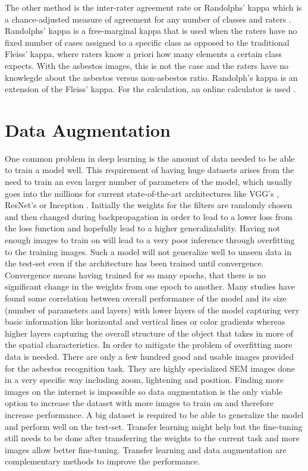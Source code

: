 The other method is the inter-rater agreement rate or Randolphs' kappa which is a chance-adjusted measure of agreement for any number of classes and raters \cite{randolph2005free}. Randolphs' kappa is a free-marginal kappa that is used when the raters have no fixed number of cases assigned to a specific class as opposed to the traditional Fleiss' kappa, where raters know a priori how many elements a certain class expects. With the asbestos images, this is not the case and the raters have no knowlegde about the asbestos versus non-asbestos ratio. Randolph's kappa is an extension of the Fleiss' kappa. For the calculation, an online calculator is used \cite{humanlevel2014}.

\section{Data Augmentation}

One common problem in deep learning is the amount of data needed to be able to train a model well. This requirement of having huge datasets arises from the need to train an even larger number of parameters of the model, which usually goes into the millions for current state-of-the-art architectures like VGG's \cite{simonyan2014very}, ResNet's \cite{he2016deep} or Inception \cite{szegedy2015going, szegedy2016rethinking}. Initially the weights for the filters are randomly chosen and then changed during backpropagation in order to lead to a lower loss from the loss function and hopefully lead to a higher generalizability. Having not enough images to train on will lead to a very poor inference through overfitting to the training images. Such a model will not generalize well to unseen data in the test-set even if the architecture has been trained until convergence. Convergence means having trained  for so many epochs, that there is no significant change in the weights from one epoch to another. Many studies have found some correlation between overall performance of the model and its size (number of parameters and layers) with lower layers of the model capturing very basic information like horizontal and vertical lines or color gradients whereas higher layers capturing the overall structure of the object that takes in more of the spatial characteristics. In order to mitigate the problem of overfitting more data is needed. There are only a few hundred good and usable images provided for the asbestos recognition task. They are highly specialized SEM images done in a very specific way including zoom, lightening and position. Finding more images on the internet is impossible so data augmentation is the only viable option to increase the dataset with more images to train on and therefore increase performance. A big dataset is required to be able to generalize the model and perform well on the test-set. Transfer learning might help but the fine-tuning still needs to be done after transferring the weights to the current task and more images allow better fine-tuning. Transfer learning and data augmentation are complementary methods to improve the performance.

